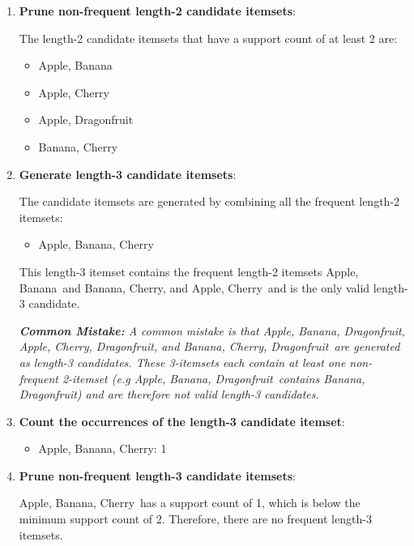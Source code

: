 \documentclass[
english,
smallborders
]{i6prcsht}
\begin{document}
\begin{solution}
\begin{enumerate}
		\item \textbf{Prune non-frequent length-2 candidate itemsets}:
		      
		      The length-2 candidate itemsets that have a support count of at least 2 are:
		      
		      \begin{itemize}	
			      \item Apple, Banana
			      \item Apple, Cherry
			      \item Apple, Dragonfruit
			      \item Banana, Cherry
		      \end{itemize}
		      
		\item \textbf{Generate length-3 candidate itemsets}:
		      
		      The candidate itemsets are generated by combining all the frequent length-2 itemsets:
		      
		      \begin{itemize}	
			      \item Apple, Banana, Cherry
		      \end{itemize}
		      
		      This length-3 itemset contains the frequent length-2 itemsets \glqq Apple, Banana\grqq\ and \glqq Banana, Cherry\grqq , and \glqq Apple, Cherry\grqq\ and is the only valid length-3 candidate.
		      
		      \textit{\textbf{Common Mistake:} A common mistake is that \glqq Apple, Banana, Dragonfruit\grqq , \glqq Apple, Cherry, Dragonfruit\grqq , and \glqq Banana, Cherry, Dragonfruit\grqq\ are generated as length-3 candidates. These 3-itemsets each contain at least one non-frequent 2-itemset (e.g \glqq Apple, Banana, Dragonfruit\grqq\ contains \glqq Banana, Dragonfruit\grqq ) and are therefore not valid length-3 candidates.}
		      
		\item \textbf{Count the occurrences of the length-3 candidate itemset}:
		      
		      \begin{itemize}	
			      \item Apple, Banana, Cherry: 1
		      \end{itemize}
		      
		\item \textbf{Prune non-frequent length-3 candidate itemsets}:
		      
		      \glqq Apple, Banana, Cherry\grqq\ has a support count of 1, which is below the minimum support count of 2. Therefore, there are no frequent length-3 itemsets.
		      

\end{enumerate}
\end{solution}
\end{document}
